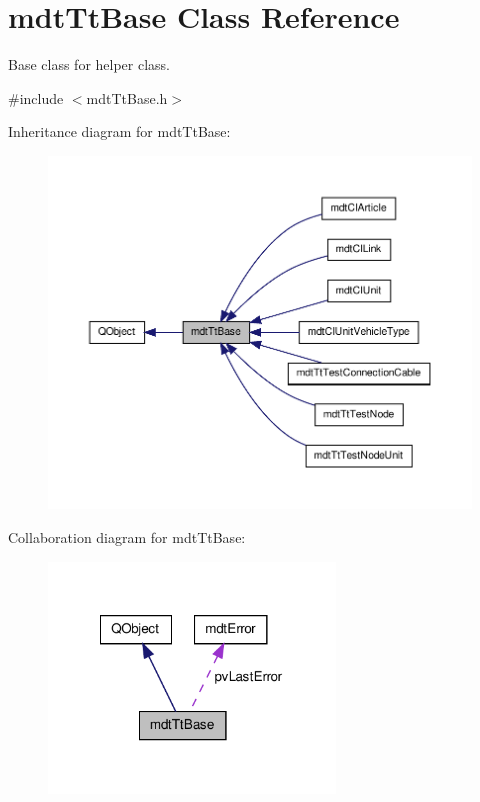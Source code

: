 \hypertarget{classmdt_tt_base}{\section{mdt\-Tt\-Base Class Reference}
\label{classmdt_tt_base}
}


Base class for helper class.  




{\ttfamily \#include $<$mdt\-Tt\-Base.\-h$>$}



Inheritance diagram for mdt\-Tt\-Base\-:\nopagebreak
\begin{figure}[H]
\begin{center}
\leavevmode
\includegraphics[width=350pt]{classmdt_tt_base__inherit__graph}
\end{center}
\end{figure}


Collaboration diagram for mdt\-Tt\-Base\-:\nopagebreak
\begin{figure}[H]
\begin{center}
\leavevmode
\includegraphics[width=216pt]{classmdt_tt_base__coll__graph}
\end{center}
\end{figure}
